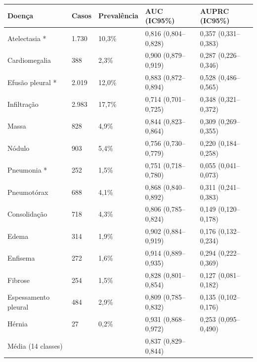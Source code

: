 \begin{tabular}{lllll}
\toprule
Doença & Casos & Prevalência & AUC (IC95\%) & AUPRC (IC95\%) \\
\midrule
Atelectasia * & 1.730 & 10,3\% & 0,816 (0,804–0,828) & 0,357 (0,331–0,383) \\
Cardiomegalia & 388 & 2,3\% & 0,900 (0,879–0,919) & 0,287 (0,226–0,346) \\
Efusão pleural * & 2.019 & 12,0\% & 0,883 (0,872–0,894) & 0,528 (0,486–0,565) \\
Infiltração & 2.983 & 17,7\% & 0,714 (0,701–0,725) & 0,348 (0,321–0,372) \\
Massa & 828 & 4,9\% & 0,844 (0,823–0,864) & 0,309 (0,269–0,355) \\
Nódulo & 903 & 5,4\% & 0,756 (0,730–0,779) & 0,220 (0,184–0,258) \\
Pneumonia * & 252 & 1,5\% & 0,751 (0,718–0,780) & 0,055 (0,041–0,073) \\
Pneumotórax & 688 & 4,1\% & 0,868 (0,840–0,892) & 0,311 (0,241–0,383) \\
Consolidação & 718 & 4,3\% & 0,806 (0,785–0,824) & 0,149 (0,120–0,178) \\
Edema & 314 & 1,9\% & 0,902 (0,884–0,919) & 0,176 (0,132–0,234) \\
Enfisema & 272 & 1,6\% & 0,914 (0,889–0,935) & 0,294 (0,222–0,369) \\
Fibrose & 254 & 1,5\% & 0,828 (0,801–0,854) & 0,127 (0,081–0,182) \\
Espessamento pleural & 484 & 2,9\% & 0,809 (0,785–0,832) & 0,135 (0,102–0,176) \\
Hérnia & 27 & 0,2\% & 0,931 (0,868–0,972) & 0,253 (0,095–0,490) \\
Média (14 classes) &  &  & 0,837 (0,829–0,844) &  \\
\bottomrule
\end{tabular}
